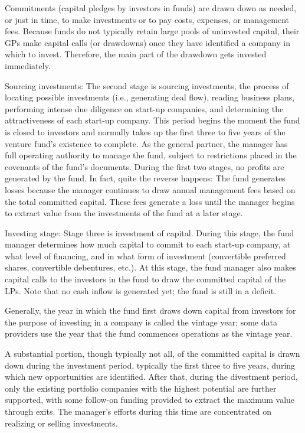 \documentclass[11pt]{article}
\begin{document}
Commitments (capital pledges by investors in funds) are drawn down as needed, or just in time, to make investments or to pay costs, expenses, or management fees. Because funds do not typically retain large pools of uninvested capital, their GPs make capital calls (or drawdowns) once they have identified a company in which to invest. Therefore, the main part of the drawdown gets invested immediately.

Sourcing investments: The second stage is sourcing investments, the process of locating possible investments (i.e., generating deal flow), reading business plans, performing intense due diligence on start-up companies, and determining the attractiveness of each start-up company. This period begins the moment the fund is closed to investors and normally takes up the first three to five years of the venture fund's existence to complete. As the general partner, the manager has full operating authority to manage the fund, subject to restrictions placed in the covenants of the fund's documents. During the first two stages, no profits are generated by the fund. In fact, quite the reverse happens: The fund generates losses because the manager continues to draw annual management fees based on the total committed capital. These fees generate a loss until the manager begins to extract value from the investments of the fund at a later stage.

Investing stage: Stage three is investment of capital. During this stage, the fund manager determines how much capital to commit to each start-up company, at what level of financing, and in what form of investment (convertible preferred shares, convertible debentures, etc.). At this stage, the fund manager also makes capital calls to the investors in the fund to draw the committed capital of the LPs. Note that no cash inflow is generated yet; the fund is still in a deficit.

Generally, the year in which the fund first draws down capital from investors for the purpose of investing in a company is called the vintage year; some data providers use the year that the fund commences operations as the vintage year.

A substantial portion, though typically not all, of the committed capital is drawn down during the investment period, typically the first three to five years, during which new opportunities are identified. After that, during the divestment period, only the existing portfolio companies with the highest potential are further supported, with some follow-on funding provided to extract the maximum value through exits. The manager's efforts during this time are concentrated on realizing or selling investments.
\end{document}
